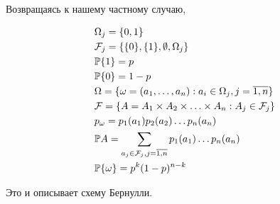 Возвращаясь к нашему частному случаю,

\[\begin{aligned}
  & \Omega_j = \{0,1\} \\
  & \mathcal F_j=\{ \{0\}, \{1\}, \emptyset, \Omega_j \} \\
  & \mathbb P\{1\} = p \\
  & \mathbb P\{0\} = 1-p \\
  & \Omega = \{ \omega=(a_1,\ldots,a_n): a_i\in\Omega_j, j=\overline{1,n} \} \\
  & \mathcal F = \{ A = A_1\times A_2\times \ldots\times A_n : A_j\in\mathcal F_j \} \\
  & p_\omega = p_1(a_1) p_2(a_2) \ldots p_n(a_n) \\
  & \mathbb P A = \sum\limits_{a_j\in\mathcal F_j, j=\overline{1,n}} p_1(a_1)\ldots p_n(a_n) \\
  & \mathbb P\{\omega\} = p^k (1-p)^{n-k}
  \end{aligned}\]

Это и описывает схему Бернулли.
